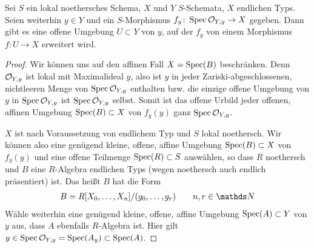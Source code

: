 \begin{Lemma}\label{thm:morphismuserweiterung}
  Sei $S$ ein lokal noethersches Schema,
  $X$ und $Y$ $S$-Schemata,
  $X$ endlichen Typs.
  Seien weiterhin $y\in Y$ und 
  ein $S$-Morphismus $f_y\colon \operatorname{Spec}\mathcal{O}_{Y,y}\to X$ gegeben.
  Dann gibt es eine offene Umgebung $U\subset Y$ von $y$, auf der
  $f_y$ von einem Morphismus $f\colon U\to X$ erweitert wird.
  \begin{proof}
    Wir können uns auf den affinen Fall $X=\operatorname{Spec}(B)$ beschränken.
    Denn $\mathcal{O}_{Y,y}$ ist lokal mit Maximalideal $y$, also ist $y$ in
    jeder Zariski-abgeschlossenen, nichtleeren Menge von $\operatorname{Spec}\mathcal{O}_{Y,y}$
    enthalten bzw. die einzige offene Umgebung von $y$ in
    $\operatorname{Spec}\mathcal{O}_{Y,y}$ ist $\operatorname{Spec}\mathcal{O}_{Y,y}$ selbst.
    Somit ist das offene Urbild jeder offenen, affinen Umgebung
    $\operatorname{Spec}(B)\subset X$ von $f_y(y)$ ganz $\operatorname{Spec}\mathcal{O}_{Y,y}$.

    $X$ ist nach Voraussetzung von endlichem Typ und $S$ lokal
    noethersch.
    Wir können also eine genügend kleine, offene, affine Umgebung
    $\operatorname{Spec}(B)\subset X$ von $f_y(y)$ und eine offene Teilmenge
    $\operatorname{Spec}(R)\subset S$ auswählen,
    so dass $R$ noethersch und $B$ eine $R$-Algebra endlichen Typs
    (wegen noethersch auch endlich präsentiert) ist. Das heißt $B$ hat
    die Form
    \begin{gather*}
      B=R[X_0,\dotsc, X_n]/(g_0,\dotsc, g_r)\qquad n,r\in\N
    \end{gather*}
    Wähle weiterhin eine genügend kleine, offene, affine Umgebung
    $\operatorname{Spec}(A)\subset Y$ von $y$ aus, dass $A$ ebenfalls $R$-Algebra ist.
    Hier gilt $y\in\operatorname{Spec}\mathcal{O}_{Y,y}=\operatorname{Spec}(A_y)\subset\operatorname{Spec}(A)$.
    

\end{proof}
\end{Lemma}
